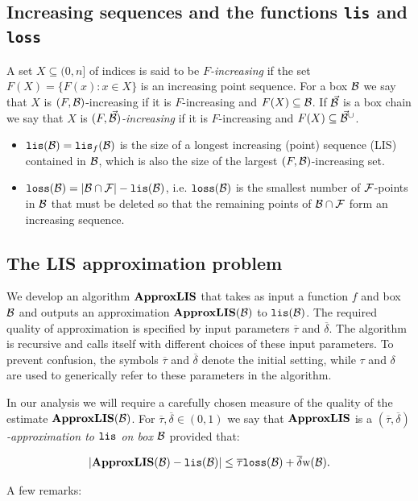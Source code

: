 \documentclass{acmsmall}
\newcommand{\cB}{{\cal B}}
\newcommand{\cF}{{\cal F}}
\newcommand{\lis}{{\tt lis}}
\newcommand{\loss}{{\tt loss}}
\newcommand{\deltapar}{\overline{\delta}}
\newcommand{\taupar}{\overline{\tau}}
\newcommand{\width}{{\bf {\rm  w}}}
\newcommand{\approxlis}{{\rm {\bf ApproxLIS}}}
\begin{document}
\subsection{Increasing sequences and the functions \lis{} and \loss}

A set $X \subseteq (0,n]$ of indices is said to be {\em $F$-increasing} if the set
$F(X)=\{F(x):x \in X\}$ is an increasing point sequence.
For a box $\cB$ we say that
$X$ is $(F,\cB)$-increasing if it is $F$-increasing and $F(X) \subseteq \cB$. 
If $\vec{\cB}$ is a box chain we say that $X$ is
{\em $(F,\vec{\cB})$-increasing} if it is $F$-increasing  
and $F(X) \subseteq \vec{\cB}^{\cup}$.


\begin{itemize}
\item $\lis(\cB)=\lis_f(\cB)$ is the size of a 
longest increasing (point) sequence (LIS) contained in $\cB$,
which is also the size of the largest $(F,\cB)$-increasing set.
\item
$\loss(\cB)=|\cB \cap \cF|-\lis(\cB)$, i.e. $\loss(\cB)$ is the smallest number of $\cF$-points in $\cB$ that must
be deleted so that the remaining points of $\cB \cap \cF$ form an increasing sequence.
\end{itemize}


\subsection{The LIS approximation problem}

We develop an algorithm $\approxlis$ that takes as input a function $f$ and  box $\cB$  
and outputs an approximation $\approxlis(\cB)$ to $\lis(\cB)$.
The required quality of approximation is specified by input parameters $\taupar$ and $\deltapar$.
The algorithm is recursive and calls itself with different choices of these input parameters.
To prevent confusion, the symbols $\taupar$ and $\deltapar$ denote the initial setting,
while $\tau$ and $\delta$ are used to generically refer to these parameters in the algorithm.

In our analysis we will require a carefully chosen measure of the quality of
the estimate $\approxlis(\cB)$.  
For $\taupar,\deltapar \in (0,1)$ we say that $\approxlis$ 
is a {\em $(\taupar,\deltapar)$-approximation to $\lis$ on box $\cB$} provided that:

\[
|\approxlis(\cB)-\lis(\cB)| \leq \taupar \loss(\cB) + \deltapar \width(\cB).
\] 

A few remarks:
\end{document}
